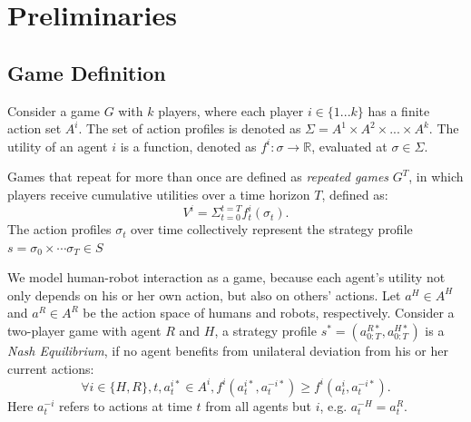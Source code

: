 \documentclass[letterpaper, 10 pt, conference]{ieeeconf}  %
\begin{document}




\section{Preliminaries}
\subsection{Game Definition}
Consider a game $G$ with $k$ players, where each player $i \in \{1...k\}$ has 
a finite action set $A^i$. The set of action profiles is denoted as 
$\Sigma = A^1 \times A^2 \times ... \times A^k$. The utility of an 
agent $i$ is a function, denoted as $f^i: \sigma \rightarrow \mathbb{R} $, 
evaluated at $\sigma \in \Sigma$. 

Games that repeat for more than once are defined as 
\textit{repeated games} $G^T$, in which players receive cumulative utilities over a 
time horizon $T$, defined as:
\begin{equation}
  V^i=\Sigma_{t=0}^{t=T} f^i_t(\sigma_t).
\end{equation}
The action profiles $\sigma_t$ over time collectively represent the 
strategy profile $s = \sigma_0 \times \cdots \sigma_T \in S$ 

We model human-robot interaction as a game, because each agent's utility not 
only depends on his or her own action, but also on others' actions. Let 
$a^H \in A^H$ and $a^R \in A^R$ be the action space of humans and robots, 
respectively. Consider a two-player game with agent $R$ and $H$, a strategy profile $s^* = (a^{R*}_{0:T},a^{H*}_{0:T})$ is a \textit{Nash Equilibrium}, if no 
agent benefits from unilateral deviation from his or her current actions:
\begin{equation}
  \forall i \in \{H,R\}, t,a^{i*}_t \in A^i, f^i(a^{i*}_t,a^{-i*}_t) \geq f^i(a^{i}_t,a^{-i*}_t). 
\end{equation}
Here $a^{-i}_t$ refers to actions at time $t$ from all agents but $i$, e.g. $a_t^{-H} = a_t^R$. 
\end{document}
